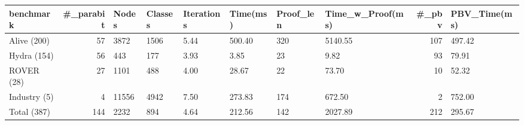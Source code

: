 \begin{tabular}{lrllllllrl}
\toprule
benchmark & #_parabit & Nodes & Classes & Iterations & Time(ms) & Proof_len & Time_w_Proof(ms) & #_pbv & PBV_Time(ms) \\
\midrule
Alive (200) & 57 & 3872 & 1506 & 5.44 & 500.40 & 320 & 5140.55 & 107 & 497.42 \\
Hydra (154) & 56 & 443 & 177 & 3.93 & 3.85 & 23 & 9.82 & 93 & 79.91 \\
ROVER (28) & 27 & 1101 & 488 & 4.00 & 28.67 & 22 & 73.70 & 10 & 52.32 \\
Industry (5) & 4 & 11556 & 4942 & 7.50 & 273.83 & 174 & 672.50 & 2 & 752.00 \\
Total (387) & 144 & 2232 & 894 & 4.64 & 212.56 & 142 & 2027.89 & 212 & 295.67 \\
\bottomrule
\end{tabular}
